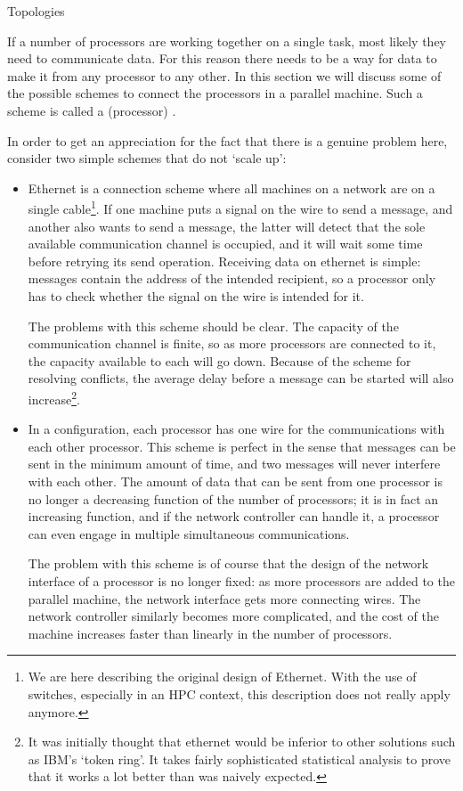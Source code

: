  {Topologies}

If a number of processors are working together on a single task, most
likely they need to communicate data. For this reason there needs to
be a way for data to make it from any processor to any other. In this
section we will discuss some of the possible schemes to connect the
processors in a parallel machine. Such a scheme is called a
(processor) .

In order to get an appreciation for the fact that there is a genuine
problem here, consider two
simple schemes that do not `scale up':
\begin{itemize}
\item Ethernet is a connection scheme where all machines on a network
  are on a single cable\footnote{We are here describing the original
    design of Ethernet. With the use of switches, especially in an HPC
    context, this description does not really apply anymore.}. If one
  machine puts a signal on the wire to send a message, and another
  also wants to send a message, the latter will detect that the sole
  available communication channel is occupied, and it will wait some
  time before retrying its send operation. Receiving data on ethernet
  is simple: messages contain the address of the intended recipient,
  so a processor only has to check whether the signal on the wire is
  intended for it.

  The problems with this scheme should be clear. The capacity of the
  communication channel is finite, so as more processors are connected
  to it, the capacity available to each will go down. Because of the
  scheme for resolving conflicts, the average delay before a message
  can be started will also increase\footnote{It was initially
  thought that ethernet would be inferior to other solutions such as
  IBM's `token ring'. It takes fairly sophisticated statistical
  analysis to prove that it works a lot better than was
  naively expected.}.
\item In a  configuration,
  each processor has one wire for
  the communications with each other processor. This scheme is perfect
  in the sense that messages can be sent in the minimum amount of time,
  and two messages will never interfere with each other.
  The amount of data that can be sent from one
  processor is no longer a decreasing function of the number of
  processors; it is in fact an increasing function, and if the
  network controller can handle it, a processor can even engage in
  multiple simultaneous communications.

  The problem with this scheme is of course that the design of the
  network interface of a processor 
  is no longer fixed: as more processors are added
  to the parallel machine, the network interface gets more
  connecting wires. The network controller similarly becomes 
  more complicated, and the cost of the machine increases faster than
  linearly in the number of processors.
\end{itemize}


